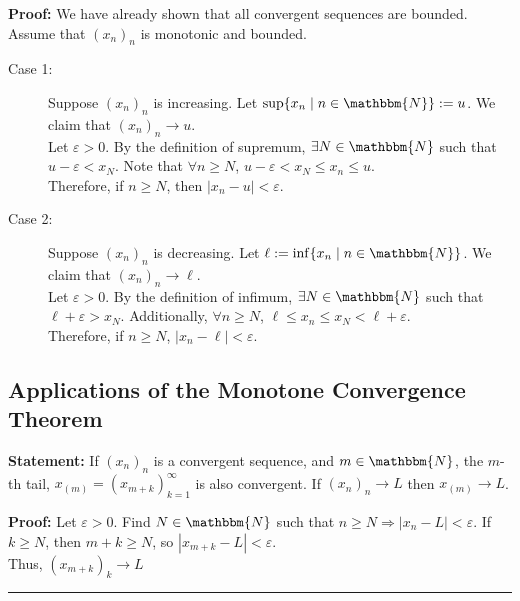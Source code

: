\documentclass[10pt]{extarticle}
\newcommand{\N}{\mathbbm{N}}
\begin{document}
  \textbf{Proof:} We have already shown that all convergent sequences are bounded.\\

    Assume that $(x_n)_n$ is monotonic and bounded.
    \begin{description}
      \item[Case 1:] Suppose $(x_n)_n$ is increasing. Let $\sup\{x_n\mid n\in\N\} := u$. We claim that $(x_n)_n \rightarrow u$.\\

        Let $\varepsilon > 0$. By the definition of supremum, $\exists N\in\N$ such that $u-\varepsilon < x_{N}$. Note that $\forall n\geq N$, $u-\varepsilon < x_N \leq x_n \leq u$.\\

        Therefore, if $n\geq N$, then $|x_n - u| < \varepsilon$.
      \item[Case 2:] Suppose $(x_n)_n$ is decreasing. Let $\ell := \inf\{x_n\mid n\in\N\}$. We claim that $(x_n)_n \rightarrow \ell$.\\

        Let $\varepsilon > 0$. By the definition of infimum, $\exists N\in\N$ such that $\ell + \varepsilon > x_N$. Additionally, $\forall n \geq N$, $\ell \leq x_n \leq x_N < \ell + \varepsilon$.\\

        Therefore, if $n \geq N$, $|x_n - \ell| < \varepsilon$.
    \end{description}
  \subsection{Applications of the Monotone Convergence Theorem}%
  \textbf{Statement:} If $(x_n)_n$ is a convergent sequence, and $m\in\N$, the $m$-th tail, $x_{(m)} = (x_{m+k})_{k=1}^{\infty}$ is also convergent. If $(x_n)_n \rightarrow L$ then $x_{(m)}\rightarrow L$.

  \textbf{Proof:} Let $\varepsilon > 0$. Find $N\in\N$ such that $n\geq N \Rightarrow |x_n - L| < \varepsilon$. If $k \geq N$, then $m + k \geq N$, so $|x_{m+k}-L| < \varepsilon$.\\

      Thus, $\left(x_{m+k}\right)_k \rightarrow L$
      \begin{center}
        \rule{0.5\textwidth}{0.4pt}
      \end{center}
\end{document}
